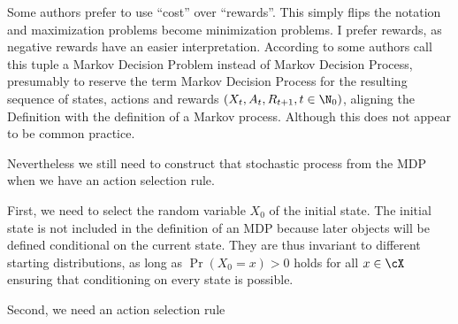 Some authors prefer to use ``cost'' over ``rewards''. This simply flips the notation and maximization problems become minimization problems. I prefer rewards, as negative rewards have an easier interpretation.
According to \textcite{putermanMarkovDecisionProcesses2005} some authors call this tuple a Markov Decision Problem instead of Markov Decision Process, presumably to reserve the term Markov Decision Process for the resulting sequence of states, actions and rewards \((X_t,A_t,R_{t+1},t\in\N_0)\), aligning the Definition with the definition of a Markov process. Although this does not appear to be common practice.

Nevertheless we still need to construct that stochastic process from the MDP when we have an action selection rule. 

First, we need to select the random variable \(X_0\) of the initial state. The initial state is not included in the definition of an MDP because later objects will be defined conditional on the current state. They are thus invariant to different starting distributions, as long as \(\Pr(X_0=x)>0\) holds for all \(x\in\cX\) ensuring that conditioning on every state is possible.

Second, we need an action selection rule

